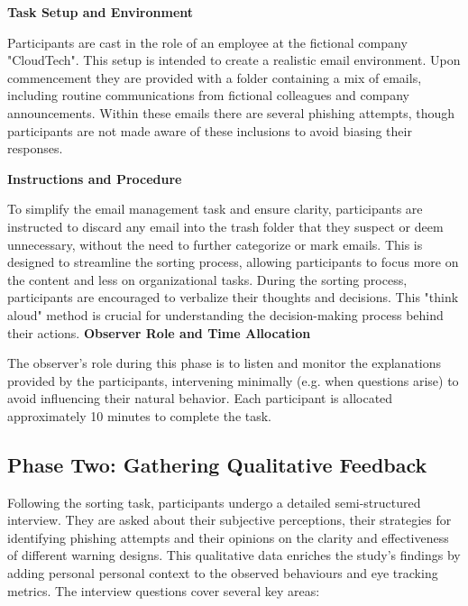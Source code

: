 \documentclass[
  a4paper,  %
  twoside,  %
  bibliography=totoc,
  headsepline,
  cleardoublepage=empty,
  parskip=half,
  draft=false
]{scrbook}
\begin{document}
\textbf{Task Setup and Environment}

Participants are cast in the role of an employee at the fictional company "CloudTech". This setup is intended to create a realistic email environment. Upon commencement they are provided with a folder containing a mix of emails, including routine communications from fictional colleagues and company announcements. Within these emails there are several phishing attempts, though participants are not made aware of these inclusions to avoid biasing their responses.  

\textbf{Instructions and Procedure}

To simplify the email management task and ensure clarity, participants are instructed to discard any email into the trash folder that they suspect or deem unnecessary, without the need to further categorize or mark emails. This is designed to streamline the sorting process, allowing participants to focus more on the content and less on organizational tasks. 
During the sorting process, participants are encouraged to verbalize their thoughts and decisions. This "think aloud" method is crucial for understanding the decision-making process behind their actions.
\newpage
\textbf{Observer Role and Time Allocation}

The observer's role during this phase is to listen and monitor the explanations provided by the participants, intervening minimally (e.g. when questions arise) to avoid influencing their natural behavior. Each participant is allocated approximately 10 minutes to complete the task.

\subsection{Phase Two: Gathering Qualitative Feedback}

Following the sorting task, participants undergo a detailed semi-structured interview. They are asked about their subjective perceptions, their strategies for identifying phishing attempts and their opinions on the clarity and effectiveness of different warning designs.
This qualitative data enriches the study’s findings by adding personal personal context to the observed behaviours and eye tracking metrics. The interview questions cover several key areas:
\end{document}
